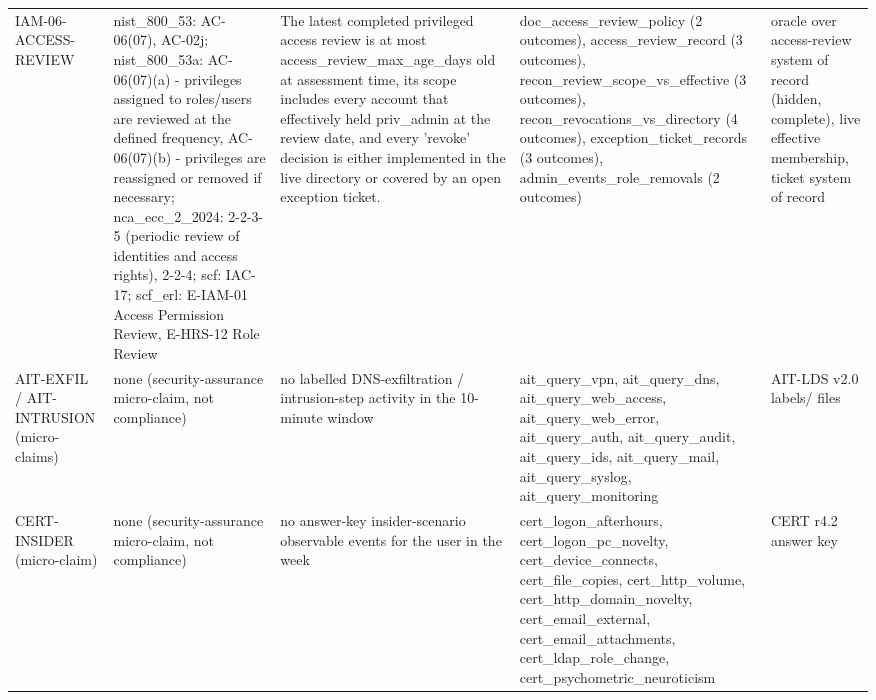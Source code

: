 \begin{table}[!ht]
{\begin{tabular}{lllll}
IAM-06-ACCESS-REVIEW & nist\_800\_53: AC-06(07), AC-02j; nist\_800\_53a: AC-06(07)(a) - privileges assigned to roles/users are reviewed at the defined frequency, AC-06(07)(b) - privileges are reassigned or removed if necessary; nca\_ecc\_2\_2024: 2-2-3-5 (periodic review of identities and access rights), 2-2-4; scf: IAC-17; scf\_erl: E-IAM-01 Access Permission Review, E-HRS-12 Role Review & The latest completed privileged access review is at most access\_review\_max\_age\_days old at assessment time, its scope includes every account that effectively held priv\_admin at the review date, and every 'revoke' decision is either implemented in the live directory or covered by an open exception ticket. & doc\_access\_review\_policy (2 outcomes), access\_review\_record (3 outcomes), recon\_review\_scope\_vs\_effective (3 outcomes), recon\_revocations\_vs\_directory (4 outcomes), exception\_ticket\_records (3 outcomes), admin\_events\_role\_removals (2 outcomes) & oracle over access-review system of record (hidden, complete), live effective membership, ticket system of record \\
AIT-EXFIL / AIT-INTRUSION (micro-claims) & none (security-assurance micro-claim, not compliance) & no labelled DNS-exfiltration / intrusion-step activity in the 10-minute window & ait\_query\_vpn, ait\_query\_dns, ait\_query\_web\_access, ait\_query\_web\_error, ait\_query\_auth, ait\_query\_audit, ait\_query\_ids, ait\_query\_mail, ait\_query\_syslog, ait\_query\_monitoring & AIT-LDS v2.0 labels/ files \\
CERT-INSIDER (micro-claim) & none (security-assurance micro-claim, not compliance) & no answer-key insider-scenario observable events for the user in the week & cert\_logon\_afterhours, cert\_logon\_pc\_novelty, cert\_device\_connects, cert\_file\_copies, cert\_http\_volume, cert\_http\_domain\_novelty, cert\_email\_external, cert\_email\_attachments, cert\_ldap\_role\_change, cert\_psychometric\_neuroticism & CERT r4.2 answer key \\
\bottomrule
\end{tabular}}
\end{table}
